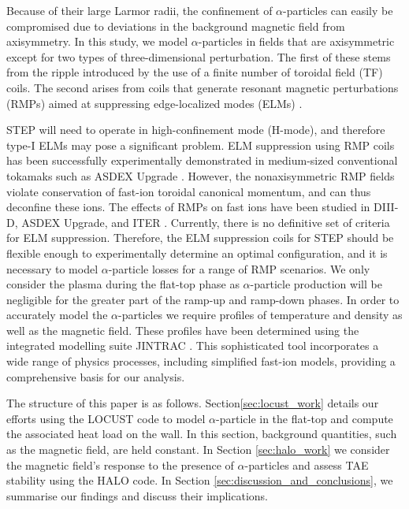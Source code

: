 \documentclass[10pt, a4paper, twoside]{article}
\begin{document}
Because of their large Larmor radii, the confinement of $\alpha$-particles can easily be compromised due to deviations in the background magnetic field from axisymmetry.  In this study, we model $\alpha$-particles in fields that are axisymmetric except for two types of three-dimensional perturbation. The first of these stems from the ripple introduced by the use of a finite number of toroidal field (TF) coils. The second arises from coils that generate resonant magnetic perturbations (RMPs) aimed at suppressing edge-localized modes (ELMs) \cite{zohm1996}.

STEP will need to operate in high-confinement mode (H-mode), and therefore type-I ELMs may pose a significant problem. ELM suppression using RMP coils has been successfully experimentally demonstrated in medium-sized conventional tokamaks such as ASDEX Upgrade \cite{suttrop2018}. However, the nonaxisymmetric RMP fields violate conservation of fast-ion toroidal canonical momentum, and can thus deconfine these ions. The effects of RMPs on fast ions have been studied in DIII-D, ASDEX Upgrade, and ITER \cite{van2015,sanchis2018,ward2022}. Currently, there is no definitive set of criteria for ELM suppression. Therefore, the ELM suppression coils for STEP should be flexible enough to experimentally determine an optimal configuration, and it is necessary to model $\alpha$-particle losses for a range of RMP scenarios.
We only consider the plasma during the flat-top phase as $\alpha$-particle production will be negligible for the greater part of the ramp-up and ramp-down phases. In order to accurately model the $\alpha$-particles we require profiles of temperature and density as well as the magnetic field. These profiles have been determined using the integrated modelling suite JINTRAC \cite{meyer2023, mitchell2023}. This sophisticated tool incorporates a wide range of physics processes, including simplified fast-ion models, providing a comprehensive basis for our analysis.

The structure of this paper is as follows. Section\ref{sec:locust_work} details our efforts using the LOCUST code to model $\alpha$-particle in the flat-top and compute the associated heat load on the wall. In this section, background quantities, such as the magnetic field, are held constant. In Section \ref{sec:halo_work} we consider the magnetic field's response to the presence of $\alpha$-particles and assess TAE stability using the HALO code. In Section \ref{sec:discussion_and_conclusions}, we summarise our findings and discuss their implications.
\end{document}
